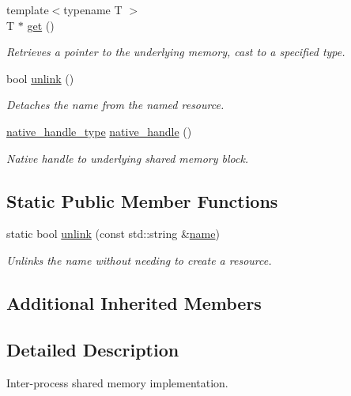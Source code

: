 \begin{DoxyCompactItemize}
{\footnotesize template$<$typename T $>$ }\\T $\ast$ \hyperlink{classcpen333_1_1process_1_1posix_1_1shared__memory_a705beedc2e0b3bde2e044fe742f641ea}{get} ()
\begin{DoxyCompactList}\small\item\em Retrieves a pointer to the underlying memory, cast to a specified type. \end{DoxyCompactList}\item 
bool \hyperlink{classcpen333_1_1process_1_1posix_1_1shared__memory_a3b6d67a41cfaca3712d87958682d8bbe}{unlink} ()
\begin{DoxyCompactList}\small\item\em Detaches the name from the named resource. \end{DoxyCompactList}\item 
\hyperlink{classcpen333_1_1process_1_1posix_1_1shared__memory_a4bec0d0093c8bcfa3283a5da8ef1fc78}{native\+\_\+handle\+\_\+type} \hyperlink{classcpen333_1_1process_1_1posix_1_1shared__memory_ac0dd258666565953b8c6bdbde7aa871f}{native\+\_\+handle} ()
\begin{DoxyCompactList}\small\item\em Native handle to underlying shared memory block. \end{DoxyCompactList}\end{DoxyCompactItemize}
\subsection*{Static Public Member Functions}
\begin{DoxyCompactItemize}
\item 
static bool \hyperlink{classcpen333_1_1process_1_1posix_1_1shared__memory_a68a9ecfafed3c939bc9c38edee71d584}{unlink} (const std\+::string \&\hyperlink{classcpen333_1_1process_1_1impl_1_1named__resource__base_a53986a0a1dd26a3602b842c45613b79d}{name})
\begin{DoxyCompactList}\small\item\em Unlinks the name without needing to create a resource. \end{DoxyCompactList}\end{DoxyCompactItemize}
\subsection*{Additional Inherited Members}


\subsection{Detailed Description}
Inter-\/process shared memory implementation. 

